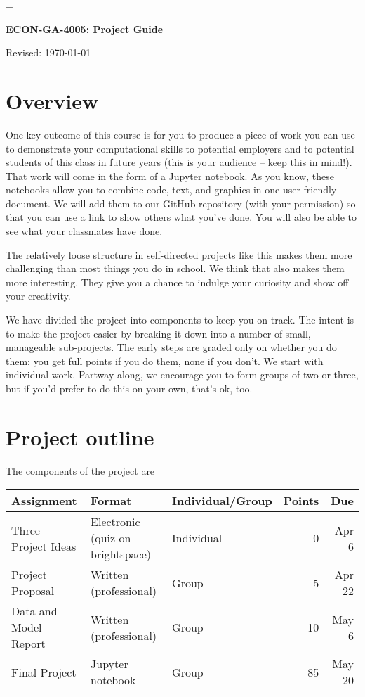 \documentclass[11pt]{article}
\begin{document}
\parskip=\bigskipamount
\parindent=0.0in
\thispagestyle{empty}


\bigskip\bigskip
\centerline{\Large \bf ECON-GA-4005:  Project Guide}
\centerline{Revised: \today}

\section*{Overview}

One key outcome of this course is for you to produce a piece of work you can use
to demonstrate your computational skills to potential employers and to potential
students of this  class in future years (this is your audience -- keep this in
mind!). That work will come in the form of a Jupyter notebook. As you know,
these notebooks allow you to combine code, text, and graphics in one
user-friendly document. We will add them to our GitHub repository (with your
permission) so that you can use a link to show others what you've done. You will
also be able to see what your classmates have done.

The relatively loose structure in self-directed projects like this makes them
more challenging than most things you do in school. We think that also makes
them more interesting. They give you a chance to indulge your curiosity and show
off your creativity.

We have divided the project into components to keep you on track. The intent is
to make the project easier by breaking it down into a number of small,
manageable sub-projects. The early steps are graded only on whether you do them:
you get full points if you do them, none if you don't. We start with individual
work.  Partway along, we encourage you to form groups of two or three, but if
you'd prefer to do this on your own, that's ok, too.


\section*{Project outline}

The components of the project are
%
\begin{center}
      \begin{tabular}{lllrr}
            \toprule
            Assignment          & Format                           & Individual/Group & Points & Due    \\
            \midrule
            Three Project Ideas & Electronic (quiz on brightspace) & Individual       & 0      & Apr 6  \\
            Project Proposal    & Written (professional)           & Group            & 5      & Apr 22 \\
            Data and Model Report         & Written (professional)           & Group            & 10     & May 6  \\
            Final Project       & Jupyter notebook                 & Group            & 85     & May 20 \\
            \bottomrule
      \end{tabular}
\end{center}
\end{document}
